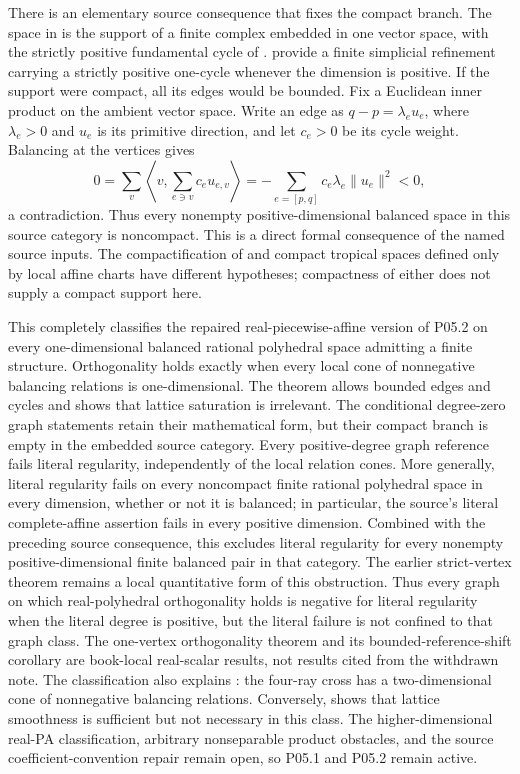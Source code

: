\documentclass[11pt,a4paper]{article}
\theoremstyle{definition}
\theoremstyle{remark}
\begin{document}
There is an elementary source consequence that fixes the compact branch.
The space in \cite[Definitions~2.2 and~2.4]{BMPS26} is the support of a
finite complex embedded in one vector space, with the strictly positive
fundamental cycle of \cite[Definition~2.27]{BMPS26}.
\cite[Proposition~3.11 and Lemma~3.25]{BMPS26} provide a finite
simplicial refinement carrying a strictly positive one-cycle whenever
the dimension is positive. If the support were compact, all its edges
would be bounded. Fix a Euclidean inner product on the ambient vector
space. Write an edge as $q-p=\lambda_e u_e$, where
$\lambda_e>0$ and $u_e$ is its primitive direction, and let $c_e>0$
be its cycle weight. Balancing at the vertices gives
\[
 0=\sum_v\left\langle v,\sum_{e\ni v}c_eu_{e,v}\right\rangle
   =-\sum_{e=[p,q]}c_e\lambda_e\lVert u_e\rVert^2<0,
\]
a contradiction. Thus every nonempty positive-dimensional balanced
space in this source category is noncompact. This is a direct formal
consequence of the named source inputs.
The compactification of \cite[Definition~2.13]{BMPS26} and compact
tropical spaces defined only by local affine charts have different
hypotheses; compactness of either does not supply a compact support here.

This completely classifies the repaired real-piecewise-affine version of
P05.2 on every one-dimensional balanced rational polyhedral space admitting
a finite structure.  Orthogonality holds exactly when every local cone of
nonnegative balancing relations is one-dimensional.  The theorem allows
bounded edges and cycles and shows that lattice saturation is irrelevant.
The conditional degree-zero graph statements retain their mathematical
form, but their compact branch is empty in the embedded source category.
Every positive-degree graph reference fails literal regularity,
independently of the local relation cones.  More generally, literal
regularity fails on every noncompact finite rational polyhedral space in
every dimension, whether or not it is balanced; in particular, the
source's literal complete-affine assertion fails in every positive
dimension. Combined with the preceding source consequence, this excludes
literal regularity for every nonempty positive-dimensional finite balanced
pair in that category. The earlier strict-vertex theorem remains a local quantitative
form of this obstruction.  Thus every graph on which real-polyhedral
orthogonality holds is negative for literal regularity when the literal
degree is positive, but the literal failure is not confined to that graph
class.  The
one-vertex orthogonality theorem and its bounded-reference-shift corollary
are book-local real-scalar results, not results cited from the withdrawn
note.  The classification also explains
: the four-ray cross has a
two-dimensional cone of nonnegative balancing relations.  Conversely,
 shows that lattice
smoothness is sufficient but not necessary in this class.  The
higher-dimensional real-PA classification, arbitrary nonseparable product
obstacles, and the source
coefficient-convention repair remain open, so P05.1 and P05.2 remain active.
\end{document}
